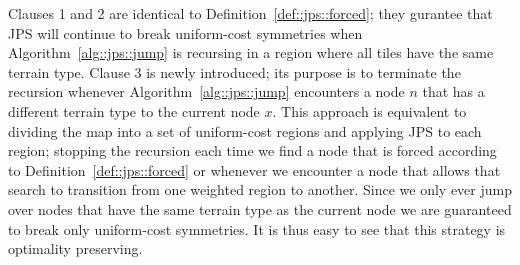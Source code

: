 Clauses 1 and 2 are identical to Definition~\ref{def::jps::forced}; they gurantee that JPS will continue 
to break uniform-cost symmetries when Algorithm~\ref{alg::jps::jump} is recursing in a region where all tiles
have the same terrain type. Clause 3 is newly introduced; its purpose is to terminate the recursion
whenever Algorithm~\ref{alg::jps::jump} encounters a node $n$ that has a different terrain type to the current
node $x$. This approach is equivalent to dividing the map into a set of uniform-cost 
regions and applying JPS to each region; stopping the recursion each time we find a node that is forced
according to Definition~\ref{def::jps::forced} or whenever we encounter a node that allows that search to 
transition from one weighted region to another. Since we only ever jump over nodes that have the same terrain 
type as the current node we are guaranteed to break only uniform-cost symmetries. It is thus easy to see that 
this strategy is optimality preserving. 
